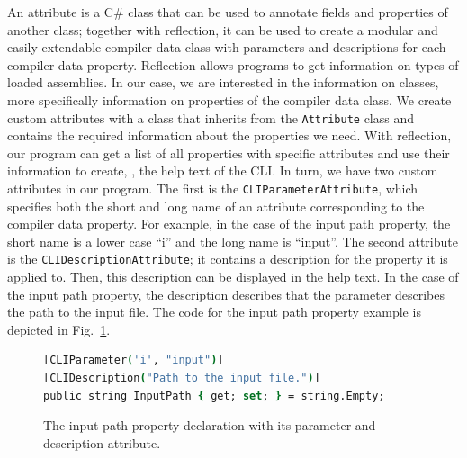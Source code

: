 An attribute is a C\# class that can be used to annotate fields and properties of another class; together with reflection, it can be used to create a modular and easily extendable compiler data class with parameters and descriptions for each compiler data property. Reflection allows programs to get information on types of loaded assemblies. In our case, we are interested in the information on classes, more specifically information on properties of the compiler data class. We create custom attributes with a class that inherits from the \texttt{Attribute} class and contains the required information about the properties we need. With reflection, our program can get a list of all properties with specific attributes and use their information to create, \eg, the help text of the CLI. In turn, we have two custom attributes in our program. The first is the \texttt{CLIParameterAttribute}, which specifies both the short and long name of an attribute corresponding to the compiler data property. For example, in the case of the input path property, the short name is a lower case ``i'' and the long name is ``input''. The second attribute is the \texttt{CLIDescriptionAttribute}; it contains a description for the property it is applied to. Then, this description can be displayed in the help text. In the case of the input path property, the description describes that the parameter describes the path to the input file. The code for the input path property example is depicted in Fig.~\ref{fig:implementation_inputPathAttribute}.

\begin{figure}[htp]
    \centering
    \begin{lstlisting}[language=csh]
[CLIParameter('i', "input")]
[CLIDescription("Path to the input file.")]
public string InputPath { get; set; } = string.Empty;
    \end{lstlisting}
    \caption{The input path property declaration with its parameter and description attribute.}
    \label{fig:implementation_inputPathAttribute}
\end{figure}


